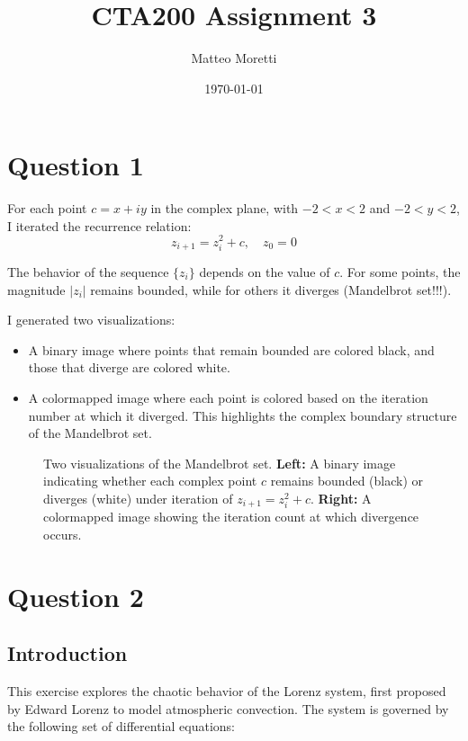 \documentclass[12pt]{article}
\title{CTA200 Assignment 3}
\author{Matteo Moretti}
\date{\today}
\begin{document}
\maketitle

\newpage

\section*{Question 1}


For each point \( c = x + iy \) in the complex plane, with \( -2 < x < 2 \) and \( -2 < y < 2 \), I iterated the recurrence relation:
\[
z_{i+1} = z_i^2 + c, \quad z_0 = 0
\]

The behavior of the sequence \( \{z_i\} \) depends on the value of \( c \). For some points, the magnitude \( |z_i| \) remains bounded, while for others it diverges (Mandelbrot set!!!).

I generated two visualizations:
\begin{itemize}
    \item A binary image where points that remain bounded are colored black, and those that diverge are colored white.
    \item A colormapped image where each point is colored based on the iteration number at which it diverged. This highlights the complex boundary structure of the Mandelbrot set.
\end{itemize}

\begin{figure}[h]
\centering
{}
\caption{Two visualizations of the Mandelbrot set. \textbf{Left:} A binary image indicating whether each complex point \( c \) remains bounded (black) or diverges (white) under iteration of \( z_{i+1} = z_i^2 + c \). \textbf{Right:} A colormapped image showing the iteration count at which divergence occurs.}
\label{fig:mandelbrot_both}
\vspace{3mm}
\end{figure}

\newpage

\section*{Question 2}

\subsection*{Introduction}
This exercise explores the chaotic behavior of the Lorenz system, first proposed by Edward Lorenz to model atmospheric convection. The system is governed by the following set of differential equations:
\end{document}
